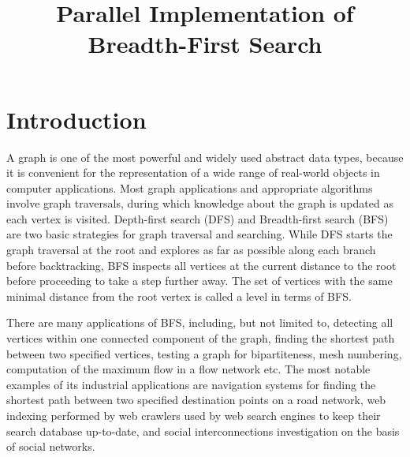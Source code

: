 \documentclass[letterpaper]{article}
\title{Parallel Implementation of Breadth-First Search} %
\begin{document}
	\maketitle

	\begin{abstract} %
		 
	\end{abstract}

	\section{Introduction}\label{sec:intro} %
		A graph is one of the most powerful and widely used abstract data types, because it is convenient for the representation of a wide range of real-world objects in computer applications.
		Most graph applications and appropriate algorithms involve graph traversals, during which knowledge about the graph is updated as each vertex is visited. 
		Depth-first search (DFS) and Breadth-first search (BFS) are two basic strategies for graph traversal and searching.
		While DFS starts the graph traversal at the root and explores as far as possible along each branch before backtracking, BFS inspects all vertices at the current distance to the root before proceeding to take a step further away. %
		The set of vertices with the same minimal distance from the root vertex is called a level in terms of BFS.
				
		There are many applications of BFS, including, but not limited to, detecting all vertices within one connected component of the graph, finding the shortest path between two specified vertices, testing a graph for bipartiteness, mesh numbering, computation of the maximum flow in a flow network etc.
		The most notable examples of its industrial applications are navigation systems for finding the shortest path between two specified destination points on a road network, web indexing performed by web crawlers used by web search engines to keep their search database up-to-date, and social interconnections investigation on the basis of social networks. %
		
\end{document}
